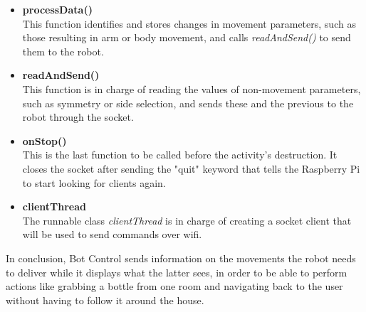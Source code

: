 	\begin{itemize}

	\item \textbf{processData()} \hfill \\
	This function identifies and stores changes in movement parameters, such as those resulting in arm or body movement, and calls \textit{readAndSend()} to send them to the robot.\\

	\item \textbf{readAndSend()} \hfill \\
	This function is in charge of reading the values of non-movement parameters, such as symmetry or side selection, and sends these and the previous to the robot through the socket.\\

	\item \textbf{onStop()} \hfill \\
	This is the last function to be called before the activity's destruction. It closes the socket after sending the "quit" keyword that tells the Raspberry Pi to start looking for clients again. \\

	\item \textbf{clientThread} \hfill \\
	The runnable class \textit{clientThread} is in charge of creating a socket client that will be used to send commands over wifi.\\

	\end{itemize}

\bigskip

In conclusion, Bot Control sends information on the movements the robot needs to deliver while it displays what the latter sees, in order to be able to perform actions like grabbing a bottle from one room and navigating back to the user without having to follow it around the house.